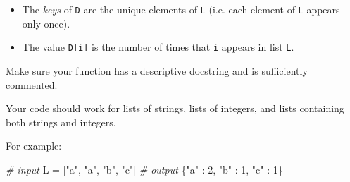 \documentclass[11pt]{article}
\providecommand{\tightlist}{%
      \setlength{\itemsep}{0pt}\setlength{\parskip}{0pt}}
\newenvironment{Shaded}{}{}
\newcommand{\DecValTok}[1]{\textcolor[rgb]{0.25,0.63,0.44}{{#1}}}
\newcommand{\StringTok}[1]{\textcolor[rgb]{0.25,0.44,0.63}{{#1}}}
\newcommand{\CommentTok}[1]{\textcolor[rgb]{0.38,0.63,0.69}{\textit{{#1}}}}
\newcommand{\NormalTok}[1]{{#1}}
\newcommand{\OperatorTok}[1]{\textcolor[rgb]{0.40,0.40,0.40}{{#1}}}
\begin{document}
\begin{itemize}
\tightlist
\item
  The \emph{keys} of \texttt{D} are the unique elements of \texttt{L}
  (i.e. each element of \texttt{L} appears only once).
\item
  The value \texttt{D{[}i{]}} is the number of times that \texttt{i}
  appears in list \texttt{L}.
\end{itemize}

Make sure your function has a descriptive docstring and is sufficiently
commented.

Your code should work for lists of strings, lists of integers, and lists
containing both strings and integers.

For example:

\begin{Shaded}
\begin{Highlighting}[]
\CommentTok{# input}
\NormalTok{L }\OperatorTok{=}\NormalTok{ [}\StringTok{"a"}\NormalTok{, }\StringTok{"a"}\NormalTok{, }\StringTok{"b"}\NormalTok{, }\StringTok{"c"}\NormalTok{]}
\CommentTok{# output}
\NormalTok{\{}\StringTok{"a"}\NormalTok{ : }\DecValTok{2}\NormalTok{, }\StringTok{"b"}\NormalTok{ : }\DecValTok{1}\NormalTok{, }\StringTok{"c"}\NormalTok{ : }\DecValTok{1}\NormalTok{\}}
\end{Highlighting}
\end{Shaded}
\end{document}
